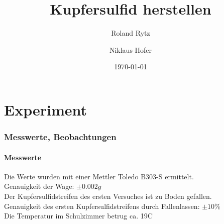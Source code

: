 \documentclass[11pt,paper=a4,final]{scrartcl}
\title{Kupfersulfid herstellen}
\author{Roland Rytz \and Niklaus Hofer}
\date{\today{}}
\begin{document}
\maketitle
\newpage
\tableofcontents
\part{Experiment}
\section{Messwerte, Beobachtungen}
\subsection{Messwerte}
Die Werte wurden mit einer Mettler Toledo B303-S ermittelt.\\
Genauigkeit der Wage: \(\pm 0.002g\)\\
Der Kupfersulfidstreifen des ersten Versuches ist zu Boden gefallen. \\
Genauigkeit des ersten Kupfersulfidstreifens durch Fallenlassen: \(\pm 10\% \)\\
Die Temperatur im Schulzimmer betrug ca. 19\textdegree C
\end{document}
